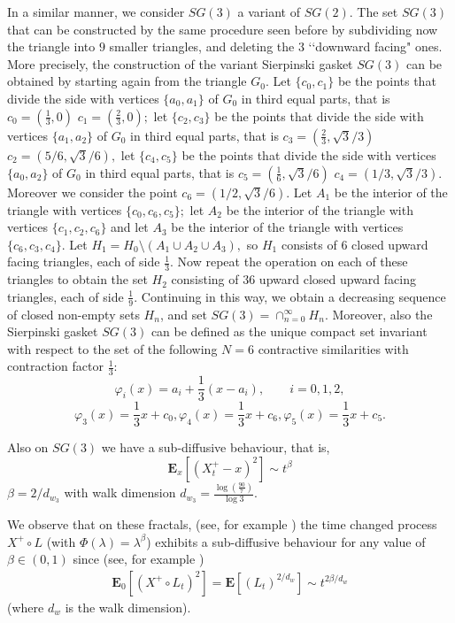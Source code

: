 \documentclass[[11pt,a4paper,reqno]{article}
\numberwithin{equation}{section}
\begin{document}
In a similar manner, we consider $SG(3)$ a variant of  $SG(2).$ 
The set  $SG(3)$ that can be constructed 
by the same procedure seen before  by subdividing now  the
triangle  into $9$  smaller triangles, and deleting the  3 \lq\lq downward
facing" ones. More precisely, the construction of the variant Sierpinski gasket  $SG(3)$ can be obtained  by starting again from the triangle $G_0.$    Let $\{c_0, c_1\}$ be the points that divide the side with vertices $\{a_0, a_1\}$   of $G_0$ in third equal parts,  that is    $c_0=(\frac13, 0)$ $c_1=(\frac23, 0);$ 
let $\{c_2, c_3\}$ be the points that divide the side with vertices $\{a_1, a_2\}$   of $G_0$  in third equal parts, that is    $c_3=(\frac23,\sqrt{3}/3 )$ $c_2=(5/6,  \sqrt{3}/6),$ 
 let $\{c_4, c_5\}$ be the points that divide the side with vertices $\{a_0, a_2\}$   of $G_0$ in third equal parts, that is    $c_5=(\frac16,\sqrt{3}/6 )$ $c_4=(1/3,  \sqrt{3}/3).$ Moreover we consider the point $c_6=(1/2,  \sqrt{3}/6).$
 Let $A_1$ be the interior of the triangle with vertices $\{c_0, c_6, c_5\};$  let $A_2$ be the interior of the triangle with vertices $\{c_1, c_2, c_6\}$ and
  let $A_3$ be the interior of the triangle with vertices $\{c_6, c_3, c_4\}.$  Let  $H_1 = H_0 \setminus  (A_1\cup A_2\cup A_3),$ so $H_1$ consists of $6$ closed upward facing triangles, each of side $\frac13.$
Now repeat the operation on each of these triangles to obtain the set $H_2$ consisting of $36$ upward
 closed upward facing triangles, each of side $\frac19.$
 Continuing in this way, we obtain a decreasing sequence of closed non-empty
sets $H_n$, and set
$SG(3)=\cap^{\infty}_{n=0} H_n.$
Moreover, also the Sierpinski gasket $SG(3)$ can be defined as the unique compact set invariant with respect to the set of the following $N=6$ contractive similarities with contraction factor $\frac13:$
$$\varphi_i(x)=a_i +\frac13(x-a_i), \quad\quad i=0,1,2, $$
$$ \varphi_3(x)=\frac13 x +c_0,  \varphi_4(x)=\frac13 x +c_6 , \varphi_5(x)=\frac13 x +c_5.$$ 

Also on $SG(3)$ we have  a sub-diffusive behaviour, that is,    $$\mathbf{E}_x[(X^+_t-x)^2] \sim  t^\beta$$  $\beta=2/d_{w_3}$ with walk dimension   
$d_{w_3}= \frac{\log(\frac{90}7)}{\log 3}.$ 




We observe that on these fractals,    (see, for example \cite[Example 6.4]{CapDovDelRus})  the time changed process $X^+ \circ L$ (with  $\Phi(\lambda) = \lambda^{\beta}$) exhibits a sub-diffusive behaviour for any value of $\beta\in(0,1)$ since (see, for example \cite[Example 6.4]{CapDovDelRus})
\begin{align*}
\mathbf{E}_0[(X^+ \circ L_t)^2] = \mathbf{E}[(L_t)^{2/d_{w}}] \sim t^ {2\beta / d_{w}}
\end{align*}
(where $d_w$ is the walk dimension).
\end{document}
